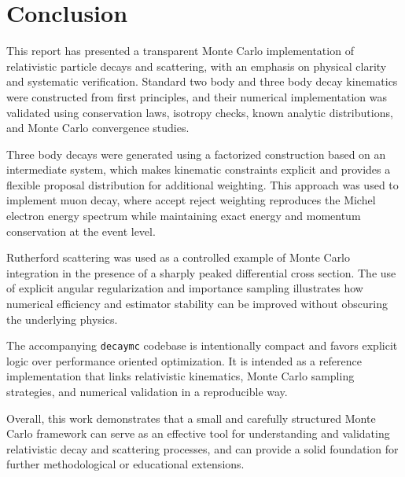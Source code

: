 \documentclass[11pt,a4paper]{article}
\begin{document}
\section{Conclusion}
\label{sec:conclusion}

This report has presented a transparent Monte Carlo implementation of relativistic
particle decays and scattering, with an emphasis on physical clarity and systematic
verification. Standard two body and three body decay kinematics were constructed from
first principles, and their numerical implementation was validated using conservation
laws, isotropy checks, known analytic distributions, and Monte Carlo convergence studies.

Three body decays were generated using a factorized construction based on an intermediate
system, which makes kinematic constraints explicit and provides a flexible proposal
distribution for additional weighting. This approach was used to implement muon decay,
where accept reject weighting reproduces the Michel electron energy spectrum while
maintaining exact energy and momentum conservation at the event level.

Rutherford scattering was used as a controlled example of Monte Carlo integration in the
presence of a sharply peaked differential cross section. The use of explicit angular
regularization and importance sampling illustrates how numerical efficiency and estimator
stability can be improved without obscuring the underlying physics.

The accompanying \texttt{decaymc} codebase is intentionally compact and favors explicit
logic over performance oriented optimization. It is intended as a reference
implementation that links relativistic kinematics, Monte Carlo sampling strategies, and
numerical validation in a reproducible way.

Overall, this work demonstrates that a small and carefully structured Monte Carlo framework
can serve as an effective tool for understanding and validating relativistic decay and
scattering processes, and can provide a solid foundation for further methodological or
educational extensions.




\end{document}
